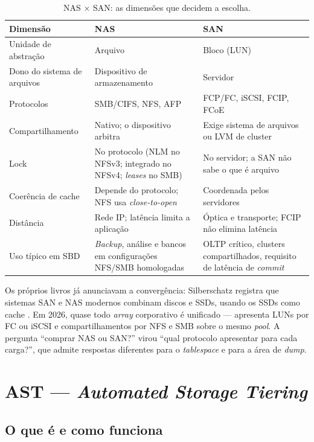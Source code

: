 \documentclass[11pt,a4paper]{article}
\begin{document}
\begin{table}[H]
\centering
\caption{NAS × SAN: as dimensões que decidem a escolha.}
\label{tab:nasxsan}
{\footnotesize
\begin{tabular}{@{}L{3.3cm}L{5.6cm}L{5.9cm}@{}}
\toprule
\textbf{Dimensão} & \textbf{NAS} & \textbf{SAN} \\
\midrule
Unidade de abstração & Arquivo & Bloco (LUN) \\
Dono do sistema de arquivos & Dispositivo de armazenamento & Servidor \\
Protocolos & SMB/CIFS, NFS, AFP & FCP/FC, iSCSI, FCIP, FCoE \\
Compartilhamento & Nativo; o dispositivo arbitra & Exige sistema de arquivos ou LVM de cluster \\
Lock & No protocolo (NLM no NFSv3; integrado no NFSv4; \textit{leases} no SMB) & No servidor; a SAN não sabe o que é arquivo \\
Coerência de cache & Depende do protocolo; NFS usa \textit{close-to-open} \cite{nfsman} & Coordenada pelos servidores \\
Distância & Rede IP; latência limita a aplicação & Óptica e transporte; FCIP não elimina latência \\
Uso típico em SBD & \textit{Backup}, análise e bancos em configurações NFS/SMB homologadas & OLTP crítico, clusters compartilhados, requisito de latência de \textit{commit} \\
\bottomrule
\end{tabular}}
\end{table}

Os próprios livros já anunciavam a convergência: Silberschatz registra que sistemas SAN e NAS modernos
combinam discos e SSDs, usando os SSDs como cache \cite{silberschatz2020}. Em 2026, quase todo
\textit{array} corporativo é unificado --- apresenta LUNs por FC ou iSCSI e compartilhamentos por NFS e
SMB sobre o mesmo \textit{pool}. A pergunta ``comprar NAS ou SAN?'' virou ``qual protocolo apresentar
para cada carga?'', que admite respostas diferentes para o \textit{tablespace} e para a área de
\textit{dump}.
\section{AST --- \textit{Automated Storage Tiering}}
\label{sec:ast}

\subsection{O que é e como funciona}
\end{document}
